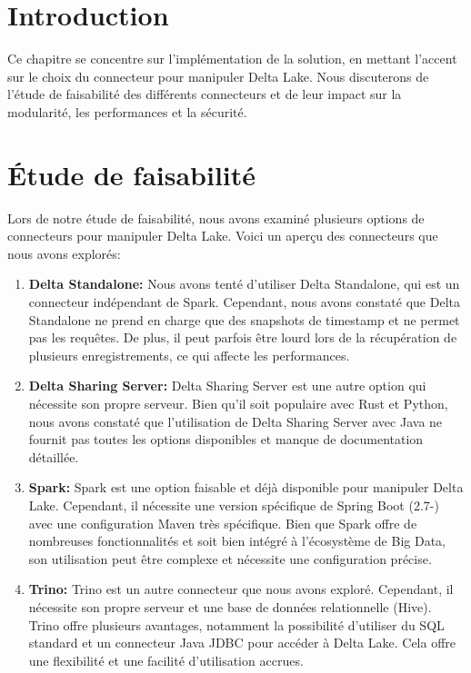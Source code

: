 
\section*{Introduction}

Ce chapitre se concentre sur l'implémentation de la solution, en mettant l'accent sur le choix du connecteur pour manipuler Delta Lake. Nous discuterons de l'étude de faisabilité des différents connecteurs et de leur impact sur la modularité, les performances et la sécurité.

\section{Étude de faisabilité}
Lors de notre étude de faisabilité, nous avons examiné plusieurs options de connecteurs pour manipuler Delta Lake. Voici un aperçu des connecteurs que nous avons explorés:

\begin{enumerate}
    \item \textbf{Delta Standalone:} Nous avons tenté d'utiliser Delta Standalone, qui est un connecteur indépendant de Spark. Cependant, nous avons constaté que Delta Standalone ne prend en charge que des snapshots de timestamp et ne permet pas les requêtes. De plus, il peut parfois être lourd lors de la récupération de plusieurs enregistrements, ce qui affecte les performances.
    \item \textbf{Delta Sharing Server:} Delta Sharing Server est une autre option qui nécessite son propre serveur. Bien qu'il soit populaire avec Rust et Python, nous avons constaté que l'utilisation de Delta Sharing Server avec Java ne fournit pas toutes les options disponibles et manque de documentation détaillée.
    \item \textbf{Spark:} Spark est une option faisable et déjà disponible pour manipuler Delta Lake. Cependant, il nécessite une version spécifique de Spring Boot (2.7-) avec une configuration Maven très spécifique. Bien que Spark offre de nombreuses fonctionnalités et soit bien intégré à l'écosystème de Big Data, son utilisation peut être complexe et nécessite une configuration précise.
    \item \textbf{Trino:} Trino est un autre connecteur que nous avons exploré. Cependant, il nécessite son propre serveur et une base de données relationnelle (Hive). Trino offre plusieurs avantages, notamment la possibilité d'utiliser du SQL standard et un connecteur Java JDBC pour accéder à Delta Lake. Cela offre une flexibilité et une facilité d'utilisation accrues.
\end{enumerate}

